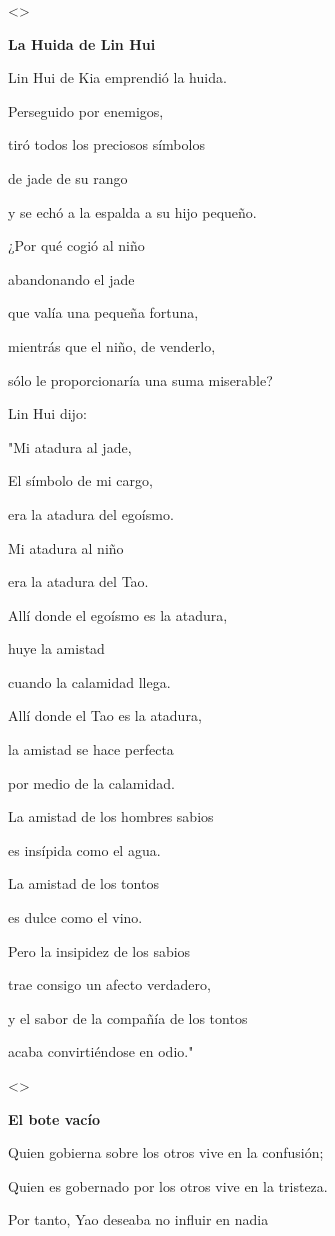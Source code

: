 \textless\textgreater{}

\textbf{{La Huida de Lin Hui}}

Lin Hui de Kia emprendió la huida.

Perseguido por enemigos,

tiró todos los preciosos símbolos

de jade de su rango

y se echó a la espalda a su hijo pequeño.

¿Por qué cogió al niño

abandonando el jade

que valía una pequeña fortuna,

mientrás que el niño, de venderlo,

sólo le proporcionaría una suma miserable?

Lin Hui dijo:

"Mi atadura al jade,

El símbolo de mi cargo,

era la atadura del egoísmo.

Mi atadura al niño

era la atadura del Tao.

Allí donde el egoísmo es la atadura,

huye la amistad

cuando la calamidad llega.

Allí donde el Tao es la atadura,

la amistad se hace perfecta

por medio de la calamidad.

La amistad de los hombres sabios

es insípida como el agua.

La amistad de los tontos

es dulce como el vino.

Pero la insipidez de los sabios

trae consigo un afecto verdadero,

y el sabor de la compañía de los tontos

acaba convirtiéndose en odio."

\textless\textgreater{}

\textbf{{El bote vacío}}

Quien gobierna sobre los otros vive en la confusión;

Quien es gobernado por los otros vive en la tristeza.

Por tanto, Yao deseaba no influir en nadia

